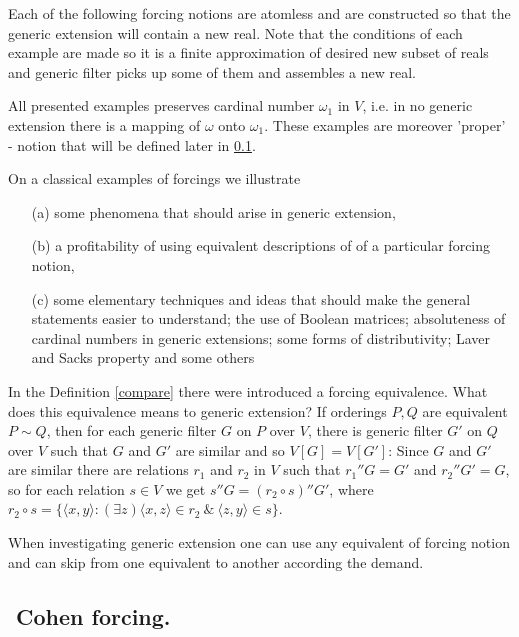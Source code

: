 Each of the following forcing notions are atomless and are constructed
so that the generic extension will contain a new real. Note that the
conditions of each example are made so it is a finite approximation of
desired new subset of reals and generic filter picks up some of them
and assembles a new real.

All presented examples preserves cardinal number $\omega_1$ in $V$,
i.e. in no generic extension there is a mapping of $\omega$ onto
$\omega_1$. These examples are moreover 'proper' - notion that will
be defined later in \ref{}.

On a classical examples of forcings we illustrate
\begin{itemize}
 \item[(a)] some phenomena that should arise in generic extension,
 \item[(b)] a profitability of using equivalent descriptions of
	of a particular forcing notion,
 \item[(c)] some elementary techniques and ideas that should make
	the general statements easier to understand;
	the use of Boolean matrices; absoluteness
	of cardinal numbers in generic extensions; some forms of
	distributivity; Laver and Sacks property and some others
\end{itemize}

In the Definition \ref{compare} there were introduced a forcing
equivalence. What does this equivalence means to generic extension?
If orderings $P,Q$ are equivalent $P\sim Q$, then for each generic filter
$G$ on $P$ over $V$, there is generic filter $G'$ on $Q$ over $V$
such that $G$ and $G'$ are similar and so $V[G] = V[G']$: Since
$G$ and $G'$ are similar there are relations $r_1$ and $r_2$ in $V$
such that $r_1''G = G'$ and $r_2''G' = G$, so for each relation
$s \in V$ we get $s''G = (r_2 \circ s)''G'$, where
$r_2 \circ s = \{\langle x,y \rangle : (\exists z) \langle x,z \rangle \in r_2 \
	\& \ \langle z,y \rangle \in s \}$.

 When investigating generic extension
one can use any equivalent of forcing notion and can skip from
one equivalent to another according the demand.

\subsection{${}$ \hspace{-1em}Cohen forcing.}


